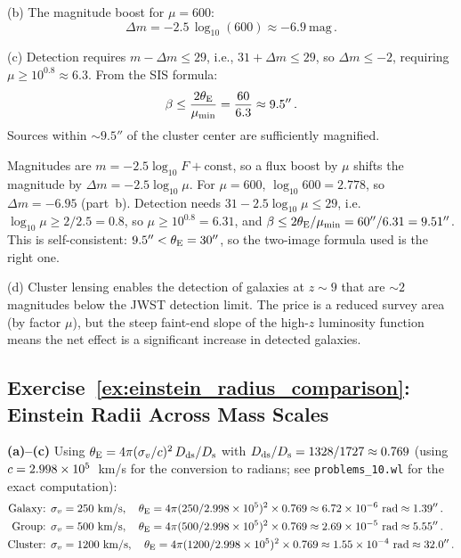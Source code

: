 (b) The magnitude boost for $\mu = 600$:
\begin{equation*}
    \Delta m = -2.5\,\log_{10}(600) \approx -6.9~\text{mag} \,.
\end{equation*}

(c) Detection requires $m - \Delta m \leq 29$, i.e.,
$31 + \Delta m \leq 29$, so $\Delta m \leq -2$, requiring
$\mu \geq 10^{0.8} \approx 6.3$.  From the SIS formula:
\begin{equation*}
    \beta \leq \frac{2\theta_{\mathrm{E}}}{\mu_{\min}}
    = \frac{60}{6.3} \approx 9.5'' \,.
\end{equation*}
Sources within $\sim 9.5''$ of the cluster center are sufficiently
magnified.

\begin{derivation}
Magnitudes are $m = -2.5\log_{10}F + \text{const}$, so a flux boost by
$\mu$ shifts the magnitude by $\Delta m = -2.5\log_{10}\mu$.  For
$\mu = 600$, $\log_{10}600 = 2.778$, so $\Delta m = -6.95$ (part~b).
Detection needs $31 - 2.5\log_{10}\mu \le 29$, i.e.\
$\log_{10}\mu \ge 2/2.5 = 0.8$, so $\mu \ge 10^{0.8} = 6.31$, and
$\beta \le 2\theta_{\mathrm{E}}/\mu_{\min} = 60''/6.31 = 9.51''$.  This is self-consistent:
$9.5'' < \theta_{\mathrm{E}} = 30''$, so the two-image formula used is the right one.
\end{derivation}

(d) Cluster lensing enables the detection of galaxies at
$z \sim 9$ that are $\sim 2$ magnitudes below the JWST detection
limit.  The price is a reduced survey area (by factor $\mu$), but
the steep faint-end slope of the high-$z$ luminosity function means
the net effect is a significant increase in detected galaxies.
\checkmark


\subsection*{Exercise~\ref{ex:einstein_radius_comparison}: Einstein Radii Across Mass Scales}

\textbf{(a)--(c)} Using $\theta_{\mathrm{E}} = 4\pi(\sigma_v/c)^2\,D_{\mathrm{ds}}/D_{\mathrm{s}}$
with $D_{\mathrm{ds}}/D_{\mathrm{s}} = 1328/1727 \approx 0.769$ (using
$c = 2.998 \times 10^5$~km/s for the conversion to radians;
see \texttt{problems\_10.wl} for the exact computation):
\begin{align*}
    \text{Galaxy: } \sigma_v &= 250~\text{km/s}, \quad
    \theta_{\mathrm{E}} = 4\pi(250/2.998\times 10^{5})^2 \times 0.769
    \approx 6.72\times 10^{-6}~\text{rad} \approx 1.39'' \,. \\
    \text{Group: } \sigma_v &= 500~\text{km/s}, \quad
    \theta_{\mathrm{E}} = 4\pi(500/2.998\times 10^{5})^2 \times 0.769
    \approx 2.69\times 10^{-5}~\text{rad} \approx 5.55'' \,. \\
    \text{Cluster: } \sigma_v &= 1200~\text{km/s}, \quad
    \theta_{\mathrm{E}} = 4\pi(1200/2.998\times 10^{5})^2 \times 0.769
    \approx 1.55\times 10^{-4}~\text{rad} \approx 32.0'' \,.
\end{align*}

